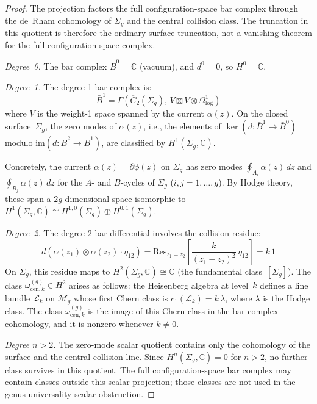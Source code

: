 \begin{proof}
The projection factors the full configuration-space bar complex
through the de~Rham cohomology of $\Sigma_g$ and the central
collision class. The truncation in this quotient is therefore the
ordinary surface truncation, not a vanishing theorem for the full
configuration-space complex.

\emph{Degree~0.} The bar complex $\bar{B}^0 = \mathbb{C}$ (vacuum), and $d^0 = 0$, so $H^0 = \mathbb{C}$.

\emph{Degree~1.} The degree-1 bar complex is:
\[
\bar{B}^1 = \Gamma(\overline{C}_2(\Sigma_g),\, V \boxtimes V \otimes \Omega^1_{\log})
\]
where $V$ is the weight-1 space spanned by the current $\alpha(z)$. On the closed surface~$\Sigma_g$, the zero modes of $\alpha(z)$, i.e., the elements of $\ker(d: \bar{B}^1 \to \bar{B}^0)$ modulo $\mathrm{im}(d: \bar{B}^2 \to \bar{B}^1)$, are classified by $H^1(\Sigma_g, \mathbb{C})$.

Concretely, the current $\alpha(z) = \partial\phi(z)$ on $\Sigma_g$ has zero modes $\oint_{A_i} \alpha(z)\, dz$ and $\oint_{B_j} \alpha(z)\, dz$ for the $A$- and $B$-cycles of $\Sigma_g$ ($i,j = 1, \ldots, g$). By Hodge theory, these span a $2g$-dimensional space isomorphic to $H^1(\Sigma_g, \mathbb{C}) \cong H^{1,0}(\Sigma_g) \oplus H^{0,1}(\Sigma_g)$.

\emph{Degree~2.} The degree-2 bar differential involves the collision residue:
\[
d(\alpha(z_1) \otimes \alpha(z_2) \cdot \eta_{12}) = \mathrm{Res}_{z_1 = z_2}\!\left[\frac{k}{(z_1-z_2)^2}\, \eta_{12}\right] = k\,1
\]
On $\Sigma_g$, this residue maps to $H^2(\Sigma_g, \mathbb{C}) \cong \mathbb{C}$ (the fundamental class~$[\Sigma_g]$). The class $\omega_{\mathrm{cen},k}^{(g)} \in H^2$ arises as follows: the Heisenberg algebra at level~$k$ defines a line bundle $\mathcal{L}_k$ on $\mathcal{M}_g$ whose first Chern class is $c_1(\mathcal{L}_k) = k\,\lambda$, where $\lambda$ is the Hodge class. The class $\omega_{\mathrm{cen},k}^{(g)}$ is the image of this Chern class in the bar complex cohomology, and it is nonzero whenever $k \neq 0$.

\emph{Degree $n > 2$.} The zero-mode scalar quotient contains only
the cohomology of the surface and the central collision line. Since
$H^n(\Sigma_g,\mathbb C)=0$ for $n>2$, no further class survives in
this quotient. The full configuration-space bar complex may contain
classes outside this scalar projection; those classes are not used in
the genus-universality scalar obstruction.
\end{proof}



